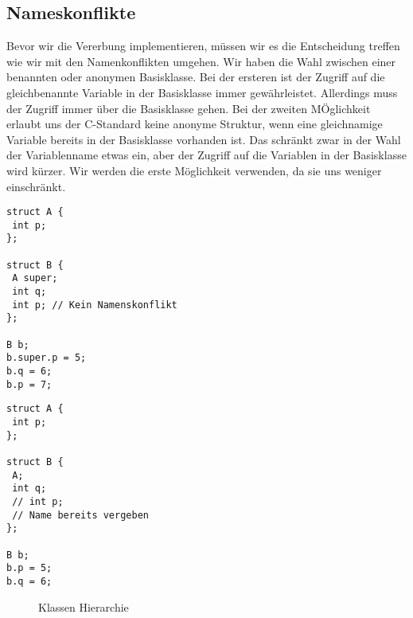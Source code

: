 \subsection{Nameskonflikte}

Bevor wir die Vererbung implementieren, müssen wir es die Entscheidung treffen wie wir mit den Namenkonflikten umgehen.
Wir haben die Wahl zwischen einer benannten oder anonymen Basisklasse.
Bei der ersteren ist der Zugriff auf die gleichbenannte Variable in der Basisklasse immer gewährleistet.
Allerdings muss der Zugriff immer über die Basisklasse gehen.
Bei der zweiten MÖglichkeit erlaubt uns der C-Standard keine anonyme Struktur, wenn eine gleichnamige Variable bereits in der Basisklasse vorhanden ist.
Das schränkt zwar in der Wahl der Variablenname etwas ein, aber der Zugriff auf die Variablen in der Basisklasse wird kürzer.
Wir werden die erste Möglichkeit verwenden, da sie uns weniger einschränkt.

\noindent\begin{minipage}{.45\textwidth}
\begin{verbatim}
struct A {
 int p;
};

struct B {
 A super;
 int q;
 int p; // Kein Namenskonflikt
};

B b;
b.super.p = 5;
b.q = 6;
b.p = 7;
\end{verbatim}
\end{minipage}\hfill
\begin{minipage}{.45\textwidth}
\begin{verbatim}
struct A {
 int p;
};

struct B {
 A;
 int q;
 // int p; 
 // Name bereits vergeben
};

B b;
b.p = 5;
b.q = 6;
\end{verbatim}
\end{minipage}











\begin{figure}[h]
	\centering
{}
\caption{Klassen Hierarchie}
\label{fig:hierarchy}
\end{figure}


